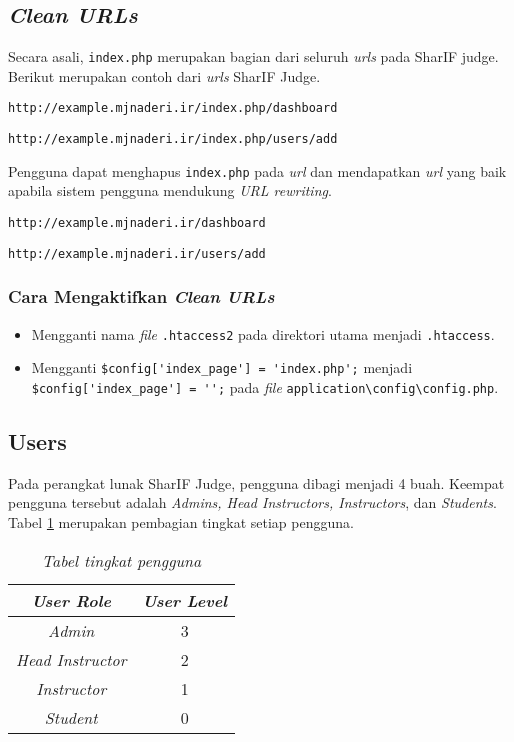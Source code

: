 \subsection{\textit{Clean URLs}}
\label{sec:cleanurls}
Secara asali, \verb|index.php| merupakan bagian dari seluruh \textit{urls} pada SharIF judge. Berikut merupakan contoh dari \textit{urls} SharIF Judge.

\begin{center}
\verb|http://example.mjnaderi.ir/index.php/dashboard|

\verb|http://example.mjnaderi.ir/index.php/users/add|
\end{center}

Pengguna dapat menghapus \verb|index.php| pada \textit{url} dan mendapatkan \textit{url} yang baik apabila sistem pengguna mendukung \textit{URL rewriting}.

\begin{center}
\verb|http://example.mjnaderi.ir/dashboard|

\verb|http://example.mjnaderi.ir/users/add|
\end{center}

\subsubsection{Cara Mengaktifkan \textit{Clean URLs}}
\begin{itemize}
\item Mengganti nama \textit{file} \verb|.htaccess2| pada direktori utama menjadi \verb|.htaccess|.
\item Mengganti \verb|$config['index_page'] = 'index.php';| menjadi \verb|$config['index_page'] = '';| pada \textit{file} \verb|application\config\config.php|.
\end{itemize}

\subsection{Users}
\label{sec:users}
Pada perangkat lunak SharIF Judge, pengguna dibagi menjadi 4 buah. Keempat pengguna tersebut adalah \textit{Admins, Head Instructors, Instructors}, dan\textit{ Students}. Tabel \ref{tab:userlevel} merupakan pembagian tingkat setiap pengguna.

\begin{table}[H]
	\centering 
	\caption{\textit{Tabel tingkat pengguna}}
	\label{tab:userlevel}
	\begin{tabular}{|c|c|}
		\hline
		\textit{\textbf{User Role}} & \textit{\textbf{User Level}} \\ \hline
		\textit{Admin} & 3 \\ \hline
		\textit{Head Instructor} & 2 \\ \hline
		\textit{Instructor} & 1 \\ \hline
		\textit{Student} & 0 \\ \hline		
	\end{tabular} 
\end{table}

